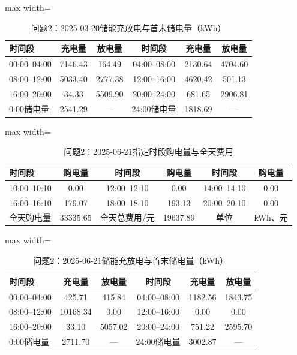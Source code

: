 \documentclass[UTF8,a4paper,zihao=-4,fontset=windows]{ctexart}
\begin{document}
\begin{table}[H]\centering\caption{问题2：2025-03-20储能充放电与首末储电量（kWh）}
\fontsize{9.5}{12}\selectfont\setlength{\tabcolsep}{4pt}\renewcommand{\arraystretch}{1.12}
\begin{adjustbox}{max width=\linewidth}\begin{tabular}{lccccc}\toprule
时间段 & 充电量 & 放电量 & 时间段 & 充电量 & 放电量\\\midrule
00:00–04:00 & 7146.43 & 164.49 & 04:00–08:00 & 2130.64 & 4704.60\\
08:00–12:00 & 5033.40 & 2777.38 & 12:00–16:00 & 4620.42 & 501.13\\
16:00–20:00 & 34.33 & 5509.90 & 20:00–24:00 & 681.65 & 2906.81\\
0:00储电量 & 2541.29 & — & 24:00储电量 & 1818.69 & —\\
\bottomrule\end{tabular}\end{adjustbox}\end{table}
\begin{table}[H]\centering\caption{问题2：2025-06-21指定时段购电量与全天费用}
\fontsize{9.5}{12}\selectfont\setlength{\tabcolsep}{4pt}\renewcommand{\arraystretch}{1.12}
\begin{adjustbox}{max width=\linewidth}\begin{tabular}{lccccc}\toprule
时间段 & 购电量 & 时间段 & 购电量 & 时间段 & 购电量\\\midrule
10:00–10:10 & 0.00 & 12:00–12:10 & 0.00 & 14:00–14:10 & 0.00\\
16:00–16:10 & 179.07 & 18:00–18:10 & 193.13 & 20:00–20:10 & 0.00\\
全天购电量 & 33335.65 & 全天总费用/元 & 19637.89 & 单位 & kWh、元\\
\bottomrule\end{tabular}\end{adjustbox}\end{table}
\begin{table}[H]\centering\caption{问题2：2025-06-21储能充放电与首末储电量（kWh）}
\fontsize{9.5}{12}\selectfont\setlength{\tabcolsep}{4pt}\renewcommand{\arraystretch}{1.12}
\begin{adjustbox}{max width=\linewidth}\begin{tabular}{lccccc}\toprule
时间段 & 充电量 & 放电量 & 时间段 & 充电量 & 放电量\\\midrule
00:00–04:00 & 425.71 & 415.84 & 04:00–08:00 & 1182.56 & 1843.75\\
08:00–12:00 & 10168.34 & 0.00 & 12:00–16:00 & 0.00 & 0.00\\
16:00–20:00 & 33.10 & 5057.02 & 20:00–24:00 & 751.22 & 2595.70\\
0:00储电量 & 2711.70 & — & 24:00储电量 & 3002.87 & —\\
\bottomrule\end{tabular}\end{adjustbox}\end{table}
\end{document}
